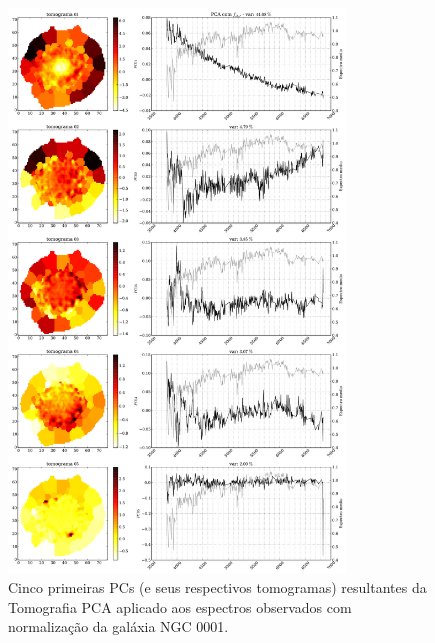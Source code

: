 \begin{figure}
    \includegraphics[width=0.8\textwidth]{figuras/K0008-tomo-obs-norm.pdf}
    \caption[Tomogramas de 1 a 5 para o cubo $f_{obs}$ - NGC 0001.]
    {Cinco primeiras PCs (e seus respectivos tomogramas) resultantes da Tomografia PCA aplicado aos espectros
    observados com normalização da galáxia NGC 0001.}
    \label{fig:K0008tomofobsnorm}
\end{figure}

